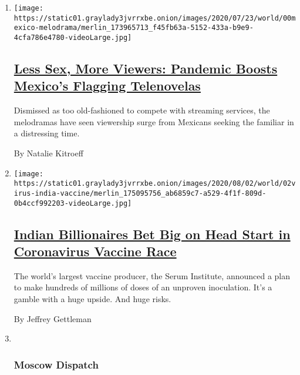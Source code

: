 \begin{enumerate}
\def\labelenumi{\arabic{enumi}.}
\item
  \texttt{[image: https://static01.graylady3jvrrxbe.onion/images/2020/07/23/world/00mexico-melodrama/merlin\_173965713\_f45fb63a-5152-433a-b9e9-4cfa786e4780-videoLarge.jpg]}

  \hypertarget{less-sex-more-viewers-pandemic-boosts-mexicos-flagging-telenovelas}{%
  \subsection{\texorpdfstring{\href{/2020/08/02/world/americas/mexico-tv-virus-telenovela.html}{Less
  Sex, More Viewers: Pandemic Boosts Mexico's Flagging
  Telenovelas}}{Less Sex, More Viewers: Pandemic Boosts Mexico's Flagging Telenovelas}}\label{less-sex-more-viewers-pandemic-boosts-mexicos-flagging-telenovelas}}

  Dismissed as too old-fashioned to compete with streaming services, the
  melodramas have seen viewership surge from Mexicans seeking the
  familiar in a distressing time.

  By Natalie Kitroeff
\item
  \texttt{[image: https://static01.graylady3jvrrxbe.onion/images/2020/08/02/world/02virus-india-vaccine/merlin\_175095756\_ab6859c7-a529-4f1f-809d-0b4ccf992203-videoLarge.jpg]}

  \hypertarget{indian-billionaires-bet-big-on-head-start-in-coronavirus-vaccine-race}{%
  \subsection{\texorpdfstring{\href{/2020/08/01/world/asia/coronavirus-vaccine-india.html}{Indian
  Billionaires Bet Big on Head Start in Coronavirus Vaccine
  Race}}{Indian Billionaires Bet Big on Head Start in Coronavirus Vaccine Race}}\label{indian-billionaires-bet-big-on-head-start-in-coronavirus-vaccine-race}}

  The world's largest vaccine producer, the Serum Institute, announced a
  plan to make hundreds of millions of doses of an unproven inoculation.
  It's a gamble with a huge upside. And huge risks.

  By Jeffrey Gettleman
\item ~
  \hypertarget{moscow-dispatch}{%
  \subsubsection{Moscow Dispatch}\label{moscow-dispatch}}


\end{enumerate}
